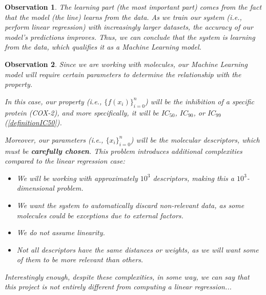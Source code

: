 \documentclass[12pt,letterpaper]{article}
\newtheorem{observation}{Observation}
\begin{document}
\begin{multicols}{2}
\begin{observation}
The \emph{learning} part (the most important part) comes from the fact that the model (the line) learns from the data. As we train our system (i.e., perform linear regression) with increasingly larger datasets, the accuracy of our model's predictions improves. Thus, we can conclude that the system is \emph{learning} from the data, which qualifies it as a Machine Learning model.\par
\end{observation}
\begin{observation}
Since we are working with molecules, our Machine Learning model will require certain parameters to determine the relationship with the property.\par
In this case, our \emph{property} (i.e., $\{f(x_i)\}_{i=0}^n$) will be the inhibition of a specific protein (COX-2), and more specifically, it will be $IC_{50}$, $IC_{90}$, or $IC_{99}$ (\ref{definitionIC50}).\par
Moreover, our \emph{parameters} (i.e., $\{x_i\}_{i=0}^n$) will be the molecular descriptors, which must be \textbf{carefully chosen}. This problem introduces additional complexities compared to the linear regression case:
\begin{itemize}
    \item We will be working with approximately $10^3$ descriptors, making this a $10^3$-dimensional problem.
    \item We want the system to automatically discard non-relevant data, as some molecules could be exceptions due to external factors.
    \item We do not assume linearity.
    \item Not all descriptors have the same distances or weights, as we will want some of them to be more relevant than others.
\end{itemize}
Interestingly enough, despite these complexities, in some way, we can say that this project is not entirely different from computing a linear regression...
\end{observation}
\end{multicols}




\newpage

 
\end{document}
